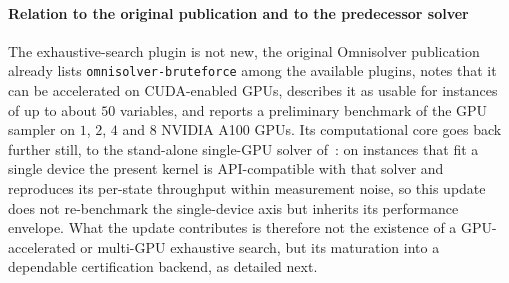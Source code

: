 \documentclass[preprint,12pt,a4paper]{elsarticle}
\begin{document}
\paragraph{Relation to the original publication and to the predecessor solver}
The exhaustive-search plugin is not new, the original Omnisolver
publication~\cite{jalowiecki2021omnisolver} already lists
\texttt{omnisolver-bruteforce} among the available plugins, notes that it can be
accelerated on CUDA-enabled GPUs, describes it as usable for instances of up to
about $50$ variables, and reports a preliminary benchmark of the GPU sampler on
$1$, $2$, $4$ and $8$ NVIDIA A100 GPUs. Its computational core goes back further
still, to the stand-alone single-GPU solver of~\cite{jalowiecki2021brute}: on
instances that fit a single device the present kernel is API-compatible with
that solver and reproduces its per-state throughput within measurement noise, so
this update does not re-benchmark the single-device axis but inherits its
performance envelope. What the update contributes is therefore not the existence
of a GPU-accelerated or multi-GPU exhaustive search, but its maturation into a
dependable certification backend, as detailed next.
\end{document}
